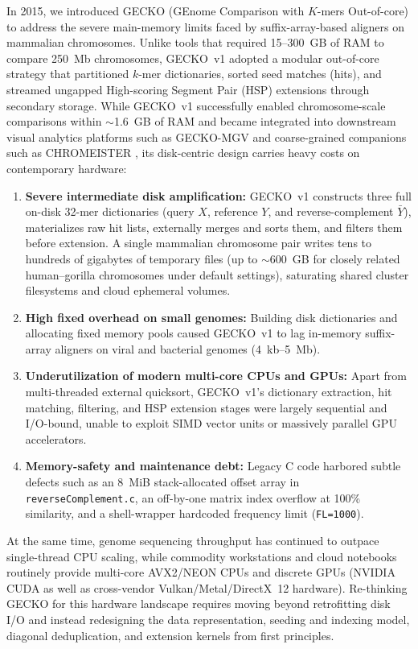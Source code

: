 \documentclass[pdflatex,sn-vancouver,Numbered]{sn-jnl}
\begin{document}
In 2015, we introduced GECKO (GEnome Comparison with $K$-mers Out-of-core) \cite{torreno2015gecko} to address the severe main-memory limits faced by suffix-array-based aligners on mammalian chromosomes. Unlike tools that required 15--300~GB of RAM to compare 250~Mb chromosomes, GECKO~v1 adopted a modular out-of-core strategy that partitioned $k$-mer dictionaries, sorted seed matches (hits), and streamed ungapped High-scoring Segment Pair (HSP) extensions through secondary storage. While GECKO~v1 successfully enabled chromosome-scale comparisons within $\sim$1.6~GB of RAM and became integrated into downstream visual analytics platforms such as GECKO-MGV \cite{diazdelpino2019geckomgv} and coarse-grained companions such as CHROMEISTER \cite{perezwohlfeil2019chromeister}, its disk-centric design carries heavy costs on contemporary hardware:
\begin{enumerate}
    \item \textbf{Severe intermediate disk amplification:} GECKO~v1 constructs three full on-disk 32-mer dictionaries (query $X$, reference $Y$, and reverse-complement $\bar{Y}$), materializes raw hit lists, externally merges and sorts them, and filters them before extension. A single mammalian chromosome pair writes tens to hundreds of gigabytes of temporary files (up to $\sim$600~GB for closely related human--gorilla chromosomes under default settings), saturating shared cluster filesystems and cloud ephemeral volumes.
    \item \textbf{High fixed overhead on small genomes:} Building disk dictionaries and allocating fixed memory pools caused GECKO~v1 to lag in-memory suffix-array aligners on viral and bacterial genomes (4~kb--5~Mb).
    \item \textbf{Underutilization of modern multi-core CPUs and GPUs:} Apart from multi-threaded external quicksort, GECKO~v1's dictionary extraction, hit matching, filtering, and HSP extension stages were largely sequential and I/O-bound, unable to exploit SIMD vector units or massively parallel GPU accelerators.
    \item \textbf{Memory-safety and maintenance debt:} Legacy C code harbored subtle defects such as an 8~MiB stack-allocated offset array in \texttt{reverseComplement.c}, an off-by-one matrix index overflow at 100\% similarity, and a shell-wrapper hardcoded frequency limit (\texttt{FL=1000}).
\end{enumerate}

At the same time, genome sequencing throughput has continued to outpace single-thread CPU scaling, while commodity workstations and cloud notebooks routinely provide multi-core AVX2/NEON CPUs and discrete GPUs (NVIDIA CUDA as well as cross-vendor Vulkan/Metal/DirectX~12 hardware). Re-thinking GECKO for this hardware landscape requires moving beyond retrofitting disk I/O and instead redesigning the data representation, seeding and indexing model, diagonal deduplication, and extension kernels from first principles.
\end{document}
